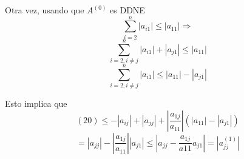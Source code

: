 \newpage

Otra vez, usando que $A^{(0)}$ es DDNE
\begin{equation*} 
\sum_{i=2}^{n}  |a_{i1}|  \leq |a_{11}| \Rightarrow
\end{equation*}
\begin{equation*} 
\sum_{i=2, i \neq j}^{n}  |a_{i1}| +|a_{j1}| \leq |a_{11}|
\end{equation*}
\begin{equation*} 
\sum_{i=2, i \neq j}^{n}  |a_{i1}|  \leq |a_{11}| - |a_{j1}|
\end{equation*}

Esto implica que
\begin{equation*} 
(20) \leq - |a_{ij}| + |a_{jj}|  + |\frac{a_{1j}}{a_{11}}|(|a_{11}| - |a_{j1}|)
\end{equation*}
\begin{equation*} 
= |a_{jj}| - | \frac{a_{1j}}{a_{11}}| |a_{j1}| \leq |a_{jj} - \frac{a_{1j}}{a{11}} a_{j1}| = |a_{jj}^{(1)}|
\end{equation*}
